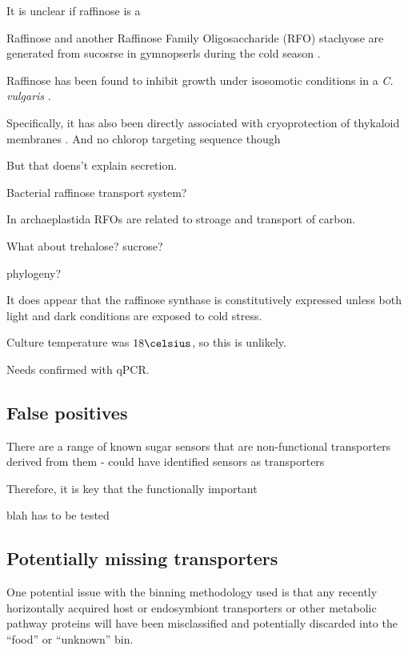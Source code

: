 {{It is unclear if raffinose is a 
\citep{Salerno1989}


Raffinose and another Raffinose Family Oligosaccharide (RFO) 
stachyose are generated from sucosrse in gymnopserls during
the cold season \citep{Kandler1982}.

Raffinose has been found to inhibit growth under
isosomotic conditions in a \textit{C. vulgaris} 
\citep{Setter1979}.

Specifically, it has also been directly associated
with cryoprotection of thykaloid membranes \citep{Lineberger1980}.
And no chlorop targeting sequence though

But that doens't explain secretion.



Bacterial raffinose transport system?


In archaeplastida RFOs are related to stroage
and transport of carbon.  



What about trehalose?
sucrose?




phylogeny?





It does appear that the raffinose synthase is constitutively
expressed unless both light and dark conditions are exposed to cold stress.

Culture temperature was \(18\celsius\), so this is unlikely. 

Needs confirmed with qPCR. 








\subsection{False positives}

There are a range of known sugar sensors that are non-functional
transporters derived from them - could have identified sensors as 
transporters \citep{Lalonde1999,Bianchi2010}

Therefore, it is key that the functionally important 

blah has to be tested

\subsection{Potentially missing transporters}

One potential issue with the binning methodology used is
that any recently horizontally acquired host or endosymbiont 
transporters or other metabolic pathway proteins will have been misclassified
and potentially discarded into the ``food'' or ``unknown'' bin.

}}
